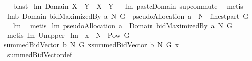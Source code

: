 \begin{isabellebody}
\isadelimproof
\ %
\endisadelimproof
%
\isatagproof
{}\isamarkupfalse%
\ blast%
\endisatagproof
{\isafoldproof}%
%
\isadelimproof
%
\endisadelimproof
\isanewline
{}\isamarkupfalse%
\ lm{}{}{\isacharcolon}\ {\isachardoublequoteopen}Domain\ {\isacharparenleft}X\ {\isacharless}{\isacharbar}{\isacharbar}\ Y{\isacharparenright}\ {\isacharequal}\ X\ {\isasymunion}\ Y{\isachardoublequoteclose}%
\isadelimproof
\ %
\endisadelimproof
%
\isatagproof
{}\isamarkupfalse%
\ lm{}{}\ paste{\isacharunderscore}Domain\ sup{\isacharunderscore}commute\ \isamarkupfalse%
\ metis%
\endisatagproof
{\isafoldproof}%
%
\isadelimproof
%
\endisadelimproof
\isanewline
{}\isamarkupfalse%
\ lm{}{}b{\isacharcolon}\ {\isachardoublequoteopen}Domain\ {\isacharparenleft}bidMaximizedBy\ a\ N\ G{\isacharparenright}\ {\isacharequal}\ pseudoAllocation\ a\ {\isasymunion}\ N\ {\isasymtimes}\ {\isacharparenleft}finestpart\ G{\isacharparenright}{\isachardoublequoteclose}%
\isadelimproof
\ %
\endisadelimproof
%
\isatagproof
{}\isamarkupfalse%
\ lm{}{}\ \isanewline
{}\isamarkupfalse%
\ metis%
\endisatagproof
{\isafoldproof}%
%
\isadelimproof
%
\endisadelimproof
\isanewline
{}\isamarkupfalse%
\ lm{}{}{\isacharcolon}\ {\isachardoublequoteopen}{\isacharparenleft}pseudoAllocation\ a{\isacharparenright}\ {\isasymsubseteq}\ Domain\ {\isacharparenleft}bidMaximizedBy\ a\ N\ G{\isacharparenright}{\isachardoublequoteclose}%
\isadelimproof
\ %
\endisadelimproof
%
\isatagproof
{}\isamarkupfalse%
\ {\isacharparenleft}metis\ lm{}{}\ Un{\isacharunderscore}upper{}{\isacharparenright}%
\endisatagproof
{\isafoldproof}%
%
\isadelimproof
%
\endisadelimproof
\isanewline
\isanewline
{}\isamarkupfalse%
\ lm{}{}{\isacharcolon}\ \ {\isachardoublequoteopen}x\ {\isasymin}\ {\isacharparenleft}N\ {\isasymtimes}\ {\isacharparenleft}Pow\ G\ {\isacharminus}\ {\isacharbraceleft}{\isacharbraceleft}{\isacharbraceright}{\isacharbraceright}{\isacharparenright}{\isacharparenright}{\isachardoublequoteclose}\ \ \isanewline
{\isachardoublequoteopen}summedBidVector{\isacharprime}\ b\ N\ G\ x{\isacharequal}summedBidVector\ b\ N\ G\ x{\isachardoublequoteclose}%
\isadelimproof
\ %
\endisadelimproof
%
\isatagproof
{}\isamarkupfalse%
\ summedBidVector{\isacharunderscore}def\ \isanewline

\end{isabellebody}
